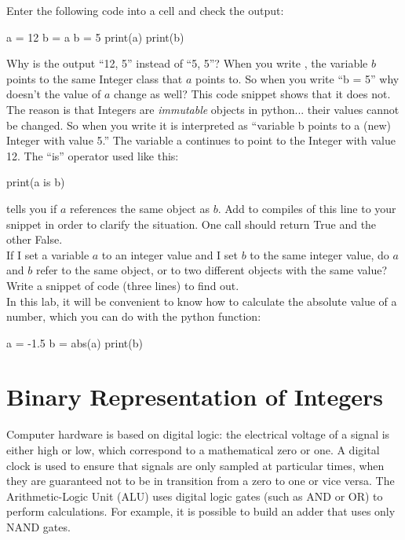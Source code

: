\plot Enter the following code into a cell and check the output:
\begin{python}
a = 12
b = a
b = 5
print(a)
print(b)
\end{python}  
Why is the output ``12, 5'' instead of ``5, 5''?  When you write
, the variable $b$ points to the same Integer class that
$a$ points to.  So when you write ``b = 5'' why doesn't the value of
$a$ change as well?  This code snippet shows that it does not.  The
reason is that Integers are {\em immutable} objects in python... their
values cannot be changed.  So when you write  it is
interpreted as ``variable b points to a (new) Integer with value 5.''
The variable a continues to point to the Integer with value 12.  The
``is'' operator used like this:
\begin{python}
  print(a is b)
\end{python}
tells you if $a$ references the same object as $b$.  Add to compiles
of this line to your snippet in order to clarify the situation.  One
call should return True and the other False.\\

\plot If I set a variable $a$ to an integer value and I set $b$ to
the same integer value, do $a$ and $b$ refer to the same object, or to
two different objects with the same value?  Write a snippet of code
(three lines) to find out.\\

In this lab, it will be convenient to know how to calculate the absolute value of a number, which you can do with the python  function:
\begin{python}
a = -1.5
b = abs(a)
print(b)
\end{python}


\section{Binary Representation of Integers}

Computer hardware is based on digital logic: the electrical voltage of
a signal is either high or low, which correspond to a mathematical
zero or one.  A digital clock is used to ensure that signals are only
sampled at particular times, when they are guaranteed not to be in
transition from a zero to one or vice versa.  The Arithmetic-Logic
Unit (ALU) uses digital logic gates (such as AND or OR) to perform
calculations.  For example, it is possible to build an adder that uses
only NAND gates.

